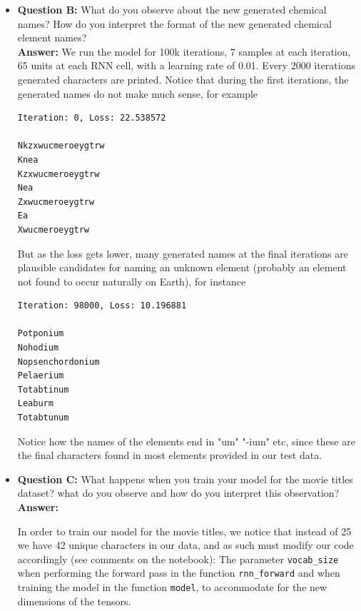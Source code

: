 \documentclass{article}
\def\code#1{\texttt{#1}}
\begin{document}
\begin{itemize}
	
	\item \textbf{Question B:} What do you observe about the new generated chemical names? How do you interpret the format of the new generated chemical element names? \\
	
	\textbf{Answer:} We run the model for 100k iterations, 7 samples at each iteration, 65 units at each RNN cell, with a learning rate of 0.01. Every 2000 iterations generated characters are printed. Notice that during the first iterations, the generated names do not make much sense, for example
	
\begin{lstlisting}
Iteration: 0, Loss: 22.538572
		
Nkzxwucmeroeygtrw
Knea
Kzxwucmeroeygtrw
Nea
Zxwucmeroeygtrw
Ea
Xwucmeroeygtrw\end{lstlisting} 

    But as the loss gets lower, many generated names at the final iterations are plausible candidates for naming an unknown element (probably an element not found to occur naturally on Earth), for instance
    
\begin{lstlisting}
Iteration: 98000, Loss: 10.196881
    
Potponium
Nohodium
Nopsenchordonium
Pelaerium
Totabtinum
Leaburm
Totabtunum\end{lstlisting}
    
    Notice how the names of the elements end in "um" "-ium" etc, since these are the final characters found in most elements provided in our test data. 
    
    \item \textbf{Question C:} What happens when you train your model for the movie titles dataset? what do you observe and how do you interpret this observation?\\
	
	\textbf{Answer:}
	
	In order to train our model for the movie titles, we notice that instead of 25 we have 42 unique characters in our data, and as such must modify our code accordingly (see comments on the notebook): The parameter \code{vocab\_size} when performing the forward pass in the function \code{rnn\_forward} and when training the model in the function \code{model}, to accommodate for the new dimensions of the tensors. \\
	

\end{itemize}
\end{document}
